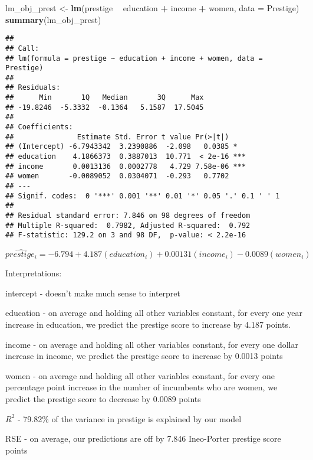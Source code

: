 \documentclass[
]{article}
\newenvironment{Shaded}{\begin{snugshade}}{\end{snugshade}}
\newcommand{\DataTypeTok}[1]{\textcolor[rgb]{0.13,0.29,0.53}{#1}}
\newcommand{\KeywordTok}[1]{\textcolor[rgb]{0.13,0.29,0.53}{\textbf{#1}}}
\newcommand{\NormalTok}[1]{#1}
\newcommand{\OperatorTok}[1]{\textcolor[rgb]{0.81,0.36,0.00}{\textbf{#1}}}
\newcommand{\StringTok}[1]{\textcolor[rgb]{0.31,0.60,0.02}{#1}}
\begin{document}
\begin{Shaded}
\begin{Highlighting}[]
\NormalTok{lm_obj_prest <-}\StringTok{ }\KeywordTok{lm}\NormalTok{(prestige }\OperatorTok{~}\StringTok{ }\NormalTok{education }\OperatorTok{+}\StringTok{ }\NormalTok{income }\OperatorTok{+}\StringTok{ }\NormalTok{women, }\DataTypeTok{data =}\NormalTok{ Prestige)}
\KeywordTok{summary}\NormalTok{(lm_obj_prest)}
\end{Highlighting}
\end{Shaded}

\begin{verbatim}
## 
## Call:
## lm(formula = prestige ~ education + income + women, data = Prestige)
## 
## Residuals:
##      Min       1Q   Median       3Q      Max 
## -19.8246  -5.3332  -0.1364   5.1587  17.5045 
## 
## Coefficients:
##               Estimate Std. Error t value Pr(>|t|)    
## (Intercept) -6.7943342  3.2390886  -2.098   0.0385 *  
## education    4.1866373  0.3887013  10.771  < 2e-16 ***
## income       0.0013136  0.0002778   4.729 7.58e-06 ***
## women       -0.0089052  0.0304071  -0.293   0.7702    
## ---
## Signif. codes:  0 '***' 0.001 '**' 0.01 '*' 0.05 '.' 0.1 ' ' 1
## 
## Residual standard error: 7.846 on 98 degrees of freedom
## Multiple R-squared:  0.7982, Adjusted R-squared:  0.792 
## F-statistic: 129.2 on 3 and 98 DF,  p-value: < 2.2e-16
\end{verbatim}

\(\hat{prestige_i} = -6.794 + 4.187(education_i) + 0.00131(income_i) - 0.0089(women_i)\)

Interpretations:

intercept - doesn't make much sense to interpret

education - on average and holding all other variables constant, for
every one year increase in education, we predict the prestige score to
increase by 4.187 points.

income - on average and holding all other variables constant, for every
one dollar increase in income, we predict the prestige score to increase
by 0.0013 points

women - on average and holding all other variables constant, for every
one percentage point increase in the number of incumbents who are women,
we predict the prestige score to decrease by 0.0089 points

\(R^2\) - 79.82\% of the variance in prestige is explained by our model

RSE - on average, our predictions are off by 7.846 Ineo-Porter prestige
score points
\end{document}
